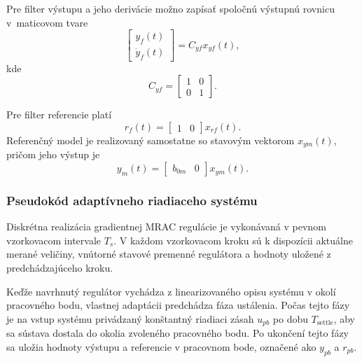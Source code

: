 Pre filter výstupu a jeho derivácie možno zapísať
spoločnú výstupnú rovnicu v~maticovom tvare
\begin{equation}
	\begin{bmatrix}
		y_f(t) \\
		\dot{y}_f(t)
	\end{bmatrix}
	=
	C_{yf}
	x_{yf}(t),
\end{equation}
kde
\begin{equation}
	C_{yf}
	=
	\begin{bmatrix}
		1 & 0 \\
		0 & 1
	\end{bmatrix}.
\end{equation}

Pre filter referencie platí
\begin{equation}
	r_f(t)
	=
	\begin{bmatrix}
		1 & 0
	\end{bmatrix}
	x_{rf}(t).
\end{equation}
Referenčný model je realizovaný samostatne
so stavovým vektorom $x_{ym}(t)$, pričom jeho výstup je
\begin{equation}
	y_m(t)
	=
	\begin{bmatrix}
		b_{0m} & 0
	\end{bmatrix}
	x_{ym}(t).
\end{equation}

\subsubsection{Pseudokód adaptívneho riadiaceho systému}
\label{sec:mrac_gradient_pseudocode}

Diskrétna realizácia gradientnej MRAC regulácie
je vykonávaná v pevnom vzorkovacom intervale $T_s$.
V každom vzorkovacom kroku sú k dispozícii
aktuálne merané veličiny,
vnútorné stavové premenné regulátora
a hodnoty uložené z predchádzajúceho kroku.

Keďže navrhnutý regulátor vychádza
z linearizovaného opisu systému v okolí pracovného bodu,
vlastnej adaptácii predchádza fáza ustálenia.
Počas tejto fázy je na vstup systému privádzaný
konštantný riadiaci zásah $u_{pb}$
po dobu $T_{\mathrm{settle}}$,
aby sa sústava dostala do okolia zvoleného pracovného bodu.
Po ukončení tejto fázy sa uložia hodnoty výstupu
a referencie v pracovnom bode,
označené ako $y_{pb}$ a $r_{pb}$.

